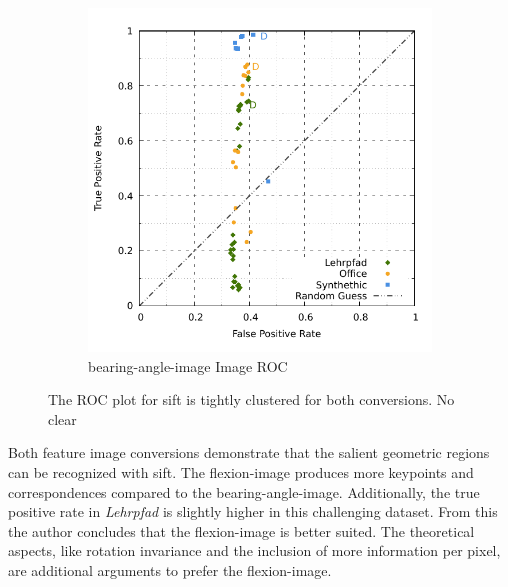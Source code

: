 \begin{figure}[htp]
\begin{subfigure}[t]{0.45\linewidth}
    \includegraphics[width=\linewidth]{chapter06/results/SIFT/bearing/roc.pdf}
    \caption{\gls{bearing-angle-image} Image ROC}
\end{subfigure}
    \caption{The ROC plot for \acrshort{sift} is tightly clustered for both conversions. No clear }\label{fig:roc_sift}
\end{figure}
Both feature image conversions demonstrate that the salient geometric regions can be recognized with \acrshort{sift}.
The \gls{flexion-image} produces more keypoints and correspondences compared to the \gls{bearing-angle-image}.
Additionally, the true positive rate in \emph{Lehrpfad} is slightly higher in this challenging dataset.
From this the author concludes that the \gls{flexion-image} is better suited.
The theoretical aspects, like rotation invariance and the inclusion of more information per pixel, are additional arguments to prefer the \gls{flexion-image}.
